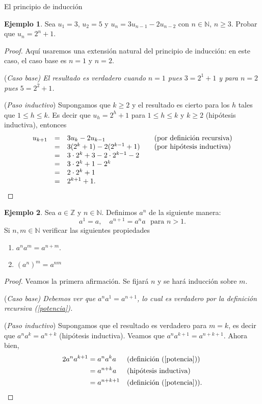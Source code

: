 \documentclass[11pt,spanish,makeidx]{amsbook}
\theoremstyle{definition}
\newtheorem{ejemplo}{Ejemplo}[section]
\theoremstyle{remark}
\begin{document}
\begin{section}{El principio de inducción}
\begin{ejemplo}
Sea $u_1 = 3$, $u_2 = 5$ y $u_n = 3u_{n-1}  - 2u_{n-2}$ con $n \in  \mathbb N$, $n \ge 3$. Probar que $u_n = 2^n + 1$.
\begin{proof} Aquí usaremos una extensión natural del principio de inducción: en este caso, el caso base es $n=1$ y $n=2$.

\noindent(\it Caso  base\rm) El resultado es verdadero cuando $n= 1$ pues $3 = 2^1+1$ y para $n=2$ pues $ 5 =2^2+1$.

\noindent ({\it Paso  inductivo}) Supongamos que $k \ge 2$ y el resultado  es cierto para los $h$ tales que  $1 \le h \le k$. Es decir que $u_h = 2^h+1$ para $1 \le h \le k$ y $k \ge 2$ (hipótesis inductiva), entonces
$$
\begin{matrix} u_{k+1} &=& 3u_k -2u_{k-1} \hfill &\quad \text{(por definición recursiva)} \hfill \\
&=& 3(2^k+1)-2(2^{k-1}+1) \hfill &\quad \text{(por hipótesis inductiva})\hfill \\
&=& 3\cdot 2^k+3-2\cdot 2^{k-1}-2 \hfill & \\
&=& 3\cdot 2^k+1- 2^{k} \hfill & \\
&=& 2\cdot 2^k+1 \hfill & \\
&=& 2^{k+1}+1. \hfill & 
\end{matrix}
$$
\end{proof}
\end{ejemplo}

\begin{ejemplo}
Sea $a \in \mathbb Z$ y $n \in \mathbb N$. Definimos $a^n$ de la siguiente manera:
\begin{equation}\label{potencia}
a^1 = a, \quad a^{n+1} = a^{n}a \,\,\text{ para $n >1$.}
\end{equation}
Si $n,m \in \mathbb N$ verificar las siguientes propiedades
\begin{enumerate}
\item \label{pot+pot}$a^{n}a^m = a^{n+m}$.
\item \label{potpot}$(a^n)^m = a^{nm}$
\end{enumerate}
\begin{proof}
Veamos la primera afirmación. Se fijará $n$ y se hará inducción sobre $m$. 

\noindent(\it Caso  base\rm) Debemos ver que $a^{n}a^1 = a^{n+1}$, lo cual es verdadero por la definición recursiva (\ref{potencia}). 

\noindent ({\it Paso  inductivo}) Supongamos que el resultado es verdadero para $m=k$, es decir que $a^{n}a^k = a^{n+k}$ (hipótesis inductiva). Veamos que  $a^{n}a^{k+1} = a^{n+k+1}$. Ahora bien, 
\begin{alignat*}2
a^{n}a^{k+1} &= a^{n}a^{k}a&  & \text{(definición (\ref{potencia}))} \\
&= a^{n+k}a& & \text{(hipótesis inductiva)} \\
&= a^{n+k+1}&  & \text{(definición (\ref{potencia}))}. 
\end{alignat*}


\end{proof}
\end{ejemplo}
\end{section}
\end{document}
